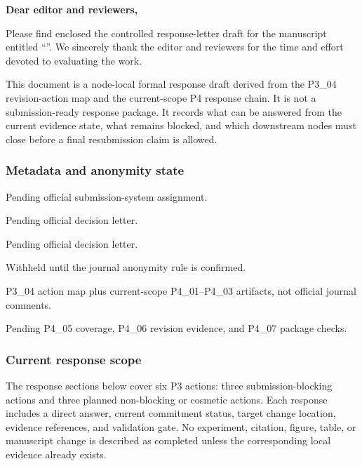 \thispagestyle{empty}
\noindent \textbf{Dear editor and reviewers,}

Please find enclosed the controlled response-letter draft for the manuscript entitled \enquote{\thetitle}. We sincerely thank the editor and reviewers for the time and effort devoted to evaluating the work.

This document is a node-local formal response draft derived from the P3\_04 revision-action map and the current-scope P4 response chain. It is not a submission-ready response package. It records what can be answered from the current evidence state, what remains blocked, and which downstream nodes must close before a final resubmission claim is allowed.

\subsubsection*{Metadata and anonymity state}
\begin{description}[leftmargin=3.2cm,style=nextline]
    \item[Manuscript ID] Pending official submission-system assignment.
    \item[Decision type] Pending official decision letter.
    \item[Editor name] Pending official decision letter.
    \item[Author block] Withheld until the journal anonymity rule is confirmed.
    \item[Response basis] P3\_04 action map plus current-scope P4\_01--P4\_03 artifacts, not official journal comments.
    \item[Final export] Pending P4\_05 coverage, P4\_06 revision evidence, and P4\_07 package checks.
\end{description}

\subsubsection*{Current response scope}
The response sections below cover six P3 actions: three submission-blocking actions and three planned non-blocking or cosmetic actions. Each response includes a direct answer, current commitment status, target change location, evidence references, and validation gate. No experiment, citation, figure, table, or manuscript change is described as completed unless the corresponding local evidence already exists.

